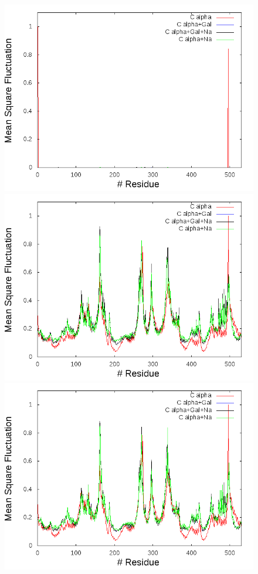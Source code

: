 \begin{figure}
 \centering
  \includegraphics[scale=0.3]{./Kap4/ANM/ANM_server/grafica_7_A_n.png}
 \includegraphics[scale=0.3]{./Kap4/ANM/ANM_server/grafica_8_A_n.png}
  \includegraphics[scale=0.3]{./Kap4/ANM/ANM_server/grafica_9_A_n.png}

\end{figure}
